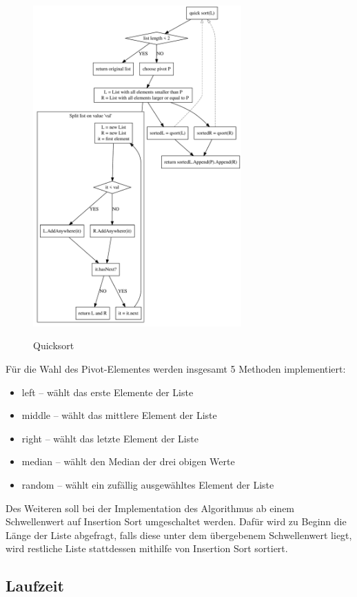 \documentclass[11pt]{article}
\begin{document}
    \begin{figure}[hbt]
        \caption{Quicksort}
        \centering
        \includegraphics[width = 8cm]{qsort.pdf}\label{fig:qsort}
    \end{figure}

    Für die Wahl des Pivot-Elementes werden insgesamt 5 Methoden implementiert:
    \begin{itemize}
        \item left -- wählt das erste Elemente der Liste
        \item middle -- wählt das mittlere Element der Liste
        \item right -- wählt das letzte Element der Liste
        \item median -- wählt den Median der drei obigen Werte
        \item random -- wählt ein zufällig ausgewähltes Element der Liste
    \end{itemize}

    Des Weiteren soll bei der Implementation des Algorithmus ab einem
    Schwellenwert auf Insertion Sort umgeschaltet werden.
    Dafür wird zu Beginn die Länge der Liste abgefragt, falls diese unter dem
    übergebenem Schwellenwert liegt, wird restliche Liste stattdessen
    mithilfe von Insertion Sort sortiert.

    \FloatBarrier

    \subsection{Laufzeit}\label{subsec:Qlaufzeit}
\end{document}
